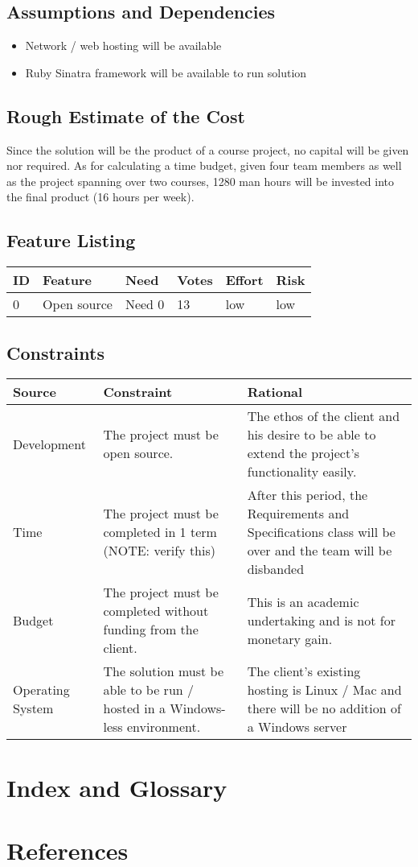 \documentclass{article}
\begin{document}
\subsection{Assumptions and Dependencies}
\begin{itemize}
\item Network / web hosting will be available
\item Ruby Sinatra framework will be available to run solution
\end{itemize}

\subsection{Rough Estimate of the Cost}
Since the solution will be the product of a course project, no capital will be given nor required.  As for calculating a time budget, given four team members as well as the project spanning over two courses, 1280 man hours will be invested into the final product (16 hours per week).
\subsection{Feature Listing}
\begin{tabular}{ | l | l | l | l | l | l | }
\hline
ID & Feature & Need & Votes & Effort & Risk\\
\hline
0 & Open source & Need 0 & 13 & low & low\\
\hline
\end{tabular}
\subsection{Constraints}
\begin{tabular}{ | p{1.2in} | p{2.4in} | p{2.4in} | }
\hline
Source & Constraint & Rational\\
\hline
Development & The project must be open source. & The ethos of the client and his desire to be able to extend the project’s functionality easily.\\
\hline
Time & The project must be completed in 1 term \newline (NOTE: verify this) & After this period, the Requirements and Specifications class will be \newline over and the team will be disbanded\\
\hline
Budget & The project must be completed without \newline funding from the client. & This is an academic undertaking and is not for monetary gain.\\
\hline
Operating System & The solution must be able to \newline be run / hosted in a Windows-less environment. & The client’s existing hosting is \newline Linux / Mac and there will be no addition of a Windows server\\
\hline
\end{tabular}

\section{Index and Glossary}

\section{References}
\end{document}

